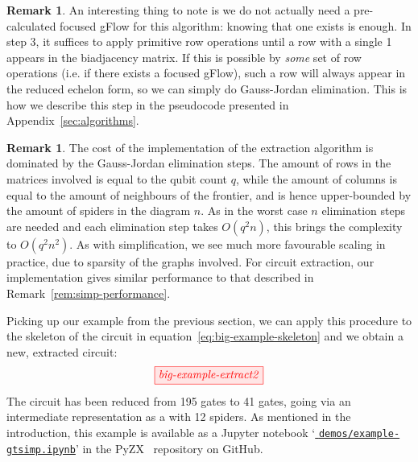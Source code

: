 \documentclass[a4paper,onecolumn,superscriptaddress,11pt,accepted=2020-04-27]{quantumarticle}
\newcommand{\CZ}{\ensuremath{\textrm{CZ}}\xspace}
\newcommand{\CX}{\ensuremath{\textrm{CNOT}}\xspace}
\newcommand{\CNOT}{\CX}
\theoremstyle{definition}
\newtheorem{remark}[theorem]{Remark}
\begin{document}

\begin{remark}
	An interesting thing to note is we do not actually need a pre-calculated focused gFlow for this algorithm: knowing that one exists is enough. In step 3, it suffices to apply primitive row operations until a row with a single 1 appears in the biadjacency matrix. If this is possible by \textit{some} set of row operations (i.e. if there exists a focused gFlow), such a row will always appear in the reduced echelon form, so we can simply do Gauss-Jordan elimination. This is how we describe this step in the pseudocode presented in Appendix~\ref{sec:algorithms}.
\end{remark}

\begin{remark}\label{rem:extract-performance}
    The cost of the implementation of the extraction algorithm is dominated by the Gauss-Jordan elimination steps. The amount of rows in the matrices involved is equal to the qubit count $q$, while the amount of columns is equal to the amount of neighbours of the frontier, and is hence upper-bounded by the amount of spiders in the diagram $n$. As in the worst case $n$ elimination steps are needed and each elimination step takes $O(q^2n)$, this brings the complexity to $O(q^2n^2)$. As with simplification, we see much more favourable scaling in practice, due to sparsity of the graphs involved. For circuit extraction, our implementation gives similar performance to that described in Remark~\ref{rem:simp-performance}.
\end{remark}

Picking up our example from the previous section, we can apply this procedure to the skeleton of the circuit in equation~\eqref{eq:big-example-skeleton} and we obtain a new, extracted circuit:
\[
\scalebox{1.0}{\tikzfig{big-example-extract2}}
\]
The circuit has been reduced from 195 gates to 41 gates, going via an intermediate representation as a \zxdiagram with 12 spiders. As mentioned in the introduction, this example is available as a Jupyter notebook `\href{https://nbviewer.jupyter.org/github/Quantomatic/pyzx/blob/906f6db3/demos/example-gtsimp.ipynb}{\color{blue!80!black} \texttt{demos/example-gtsimp.ipynb}}' in the PyZX~\cite{pyzx} repository on GitHub.
\end{document}
